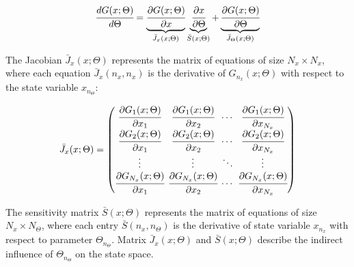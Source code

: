 \documentclass[a4paper,fleqn]{cas-dc}
\begin{document}
	{\footnotesize
		\begin{equation} \label{SA_eq_full}
			\cfrac{d G(x;\Theta)}{d \Theta} = \underbrace{ \cfrac{\partial G(x;\Theta)}{\partial x} }_{{\bar{J}_x}(x;\Theta)} \underbrace{\cfrac{\partial x}{\partial \Theta} }_{\bar{S}(x;\Theta)} + \underbrace{ \cfrac{\partial G(x;\Theta)}{\partial \Theta} }_{{\bar{J}_\Theta}(x;\Theta)}
	\end{equation} }
	
	The Jacobian ${\bar{J}_x}(x;\Theta)$ represents the matrix of equations of size $N_x \times N_x$, where each equation ${\bar{J}_x}(n_x,n_x)$ is the derivative of $G_{n_x}(x;\Theta)$ with respect to the state variable $x_{n_\Theta}$:
	
	{\footnotesize
		\begin{align}
			\begingroup %
			\setlength\arraycolsep{2pt}
			{\bar{J}_x}(x;\Theta)=\begin{pmatrix}
				\cfrac{\partial {G_{1}}(x;\Theta)}{\partial {x_{1}}} & \cfrac{\partial {G_{1}}(x;\Theta)}{\partial {x_{2}}} & \cdots & \cfrac{\partial {G_{1}}(x;\Theta)}{\partial {x_{N_x}}}\\
				\cfrac{\partial {G_{2}}(x;\Theta)}{\partial {x_{1}}} & \cfrac{\partial {G_{2}}(x;\Theta)}{\partial {x_{2}}} & \cdots & \cfrac{\partial {G_{2}}(x;\Theta)}{\partial {x_{N_x}}}\\
				\vdots & \vdots & \ddots & \vdots\\ 
				\cfrac{\partial {G_{N_x}}(x;\Theta)}{\partial {x_{1}}} & \cfrac{\partial {G_{N_x}}(x;\Theta)}{\partial {x_{2}}} & \cdots & \cfrac{\partial {G_{N_x}}(x;\Theta)}{\partial {x_{N_x}}}\\
			\end{pmatrix}
			\endgroup
	\end{align} }
	
	The sensitivity matrix $\bar{S}(x;\Theta)$ represents the matrix of equations of size $N_x \times N_\Theta$, where each entry $\bar{S}(n_x,n_\Theta)$ is the derivative of state variable $x_{n_x}$ with respect to parameter $\Theta_{n_\Theta}$. Matrix ${\bar{J}_x}(x;\Theta)$ and $\bar{S}(x;\Theta)$ describe the indirect influence of $\Theta_{n_\Theta}$ on the state space.
	
\end{document}
